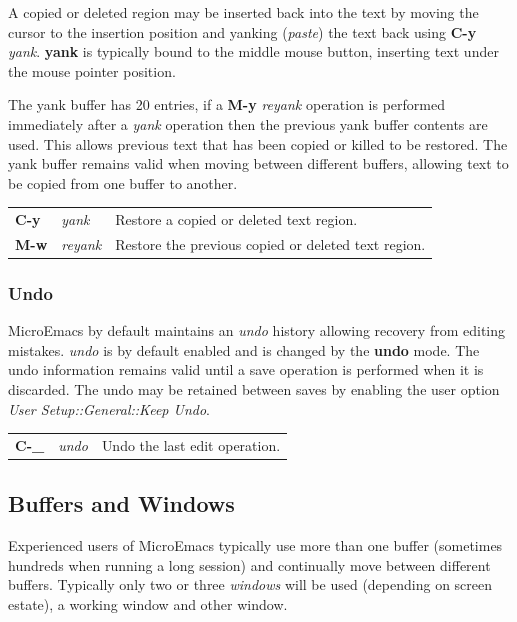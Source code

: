 \documentclass[11pt,a4paper,pdftex]{article}
\begin{document}
  A copied or deleted region may be inserted back into the text by moving the
  cursor to the insertion position and yanking (\textit{paste}) the text back
  using \textbf{C-y} \textit{yank}. \textbf{yank} is typically bound to the
  middle mouse button, inserting text under the mouse pointer position.

  The yank buffer has 20 entries, if a \textbf{M-y} \textit{reyank} operation
  is performed immediately after a \textit{yank} operation then the previous
  yank buffer contents are used. This allows previous text that has been
  copied or killed to be restored. The yank buffer remains valid when moving
  between different buffers, allowing text to be copied from one buffer to
  another.

  \begin{longtable}{ll@{\ --\ }l}
    \endhead
    \endfoot
    \endlastfoot
    \textbf{C-y} & \textit{yank} &
    Restore a copied or deleted text region.\\
    \textbf{M-w} & \textit{reyank} &
    Restore the previous copied or deleted text region.\\
  \end{longtable}

\subsubsection{Undo}

  MicroEmacs by default maintains an \textit{undo} history allowing recovery
  from editing mistakes. \textit{undo} is by default enabled and is changed by
  the \textbf{undo} mode. The undo information remains valid until a save
  operation is performed when it is discarded. The undo may be retained
  between saves by enabling the user option \textit{User
  Setup::\-General::\-Keep Undo}.

  \begin{longtable}{ll@{\ --\ }l}
    \endhead
    \endfoot
    \endlastfoot
    \textbf{C-\_} & \textit{undo} &
    Undo the last edit operation.\\
  \end{longtable}

\subsection{Buffers and Windows}

  Experienced users of MicroEmacs typically use more than one buffer
  (sometimes hundreds when running a long session) and continually move
  between different buffers. Typically only two or three \textit{windows} will
  be used (depending on screen estate), a working window and other window.
\end{document}
